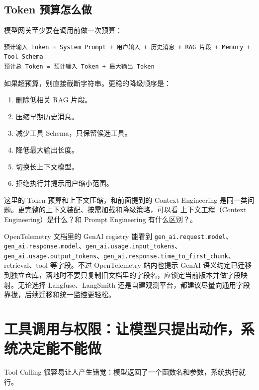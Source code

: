 \documentclass[9pt,a4paper,twocolumn]{ctexart}
\begin{document}
\subsection*{Token 预算怎么做}


模型网关至少要在调用前做一次预算：



\begin{lstlisting}
预计输入 Token = System Prompt + 用户输入 + 历史消息 + RAG 片段 + Memory + Tool Schema
预计总 Token = 预计输入 Token + 最大输出 Token
\end{lstlisting}



如果超预算，别直接截断字符串。更稳的降级顺序是：


\begin{enumerate}[itemsep=1pt, topsep=2pt]
  \item 删除低相关 RAG 片段。
  \item 压缩早期历史消息。
  \item 减少工具 Schema，只保留候选工具。
  \item 降低最大输出长度。
  \item 切换长上下文模型。
  \item 拒绝执行并提示用户缩小范围。
\end{enumerate}


这里的 Token 预算和上下文压缩，和前面提到的 Context Engineering 是同一类问题。更完整的上下文装配、按需加载和降级策略，可以看 上下文工程（Context Engineering）是什么？和 Prompt Engineering 有什么区别？。



OpenTelemetry 文档里的 GenAI registry 能看到 \texttt{gen\_ai.request.model}、\texttt{gen\_ai.response.model}、\texttt{gen\_ai.usage.input\_tokens}、\texttt{gen\_ai.usage.output\_tokens}、\texttt{gen\_ai.response.time\_to\_first\_chunk}、retrieval、tool 等字段。不过 OpenTelemetry 站内也提示 GenAI 语义约定已迁移到独立仓库，落地时不要只复制旧文档里的字段名，应锁定当前版本并做字段映射。无论选择 Langfuse、LangSmith 还是自建观测平台，都建议尽量向通用字段靠拢，后续迁移和统一监控更轻松。



\section*{工具调用与权限：让模型只提出动作，系统决定能不能做}


Tool Calling 很容易让人产生错觉：模型返回了一个函数名和参数，系统执行就行。
\end{document}
